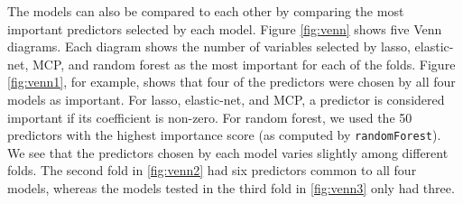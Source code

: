 \documentclass{article}
\begin{document}
The models can also be compared to each other by comparing the most important predictors selected by each model. Figure \ref{fig:venn} shows five Venn diagrams. Each diagram shows the number of variables selected by lasso, elastic-net, MCP, and random forest as the most important for each of the folds. Figure \ref{fig:venn1}, for example, shows that four of the predictors were chosen by all four models as important. For lasso, elastic-net, and MCP, a predictor is considered important if its coefficient is non-zero. For random forest, we used the 50 predictors with the highest importance score (as computed by \lstinline!randomForest!). We see that the predictors chosen by each model varies slightly among different folds. The second fold in \ref{fig:venn2} had six predictors common to all four models, whereas the models tested in the third fold in \ref{fig:venn3} only had three.
\end{document}
